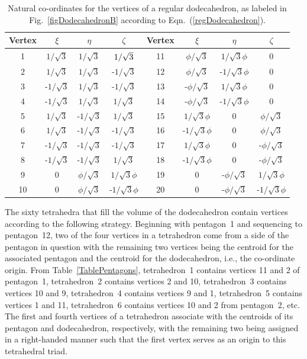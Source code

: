 \begin{table}
	\begin{center}
	\begin{tabular}{|c|ccc||c|ccc|}
		\hline 
		Vertex & $\xi$ & $\eta$ & $\zeta$ & Vertex & $\xi$ & $\eta$ & $\zeta$ \\ \hline
		1 & $1 / \sqrt{3}$ & $1 / \sqrt{3}$ & $1 / \sqrt{3}^{\vphantom{|}}$ & 
		   11 & $\phi / \sqrt{3}$ & $1 / \sqrt{3} \phi$ & 0 \\
		2 & $1 / \sqrt{3}$ & $1 / \sqrt{3}$ & -$1 / \sqrt{3}$ & 
		   12 & $\phi / \sqrt{3}$ & -$1 / \sqrt{3}\phi$ & 0 \\
		3 & -$1 / \sqrt{3}$ & $1 / \sqrt{3}$ & -$1 / \sqrt{3}$ & 
		   13 & -$\phi / \sqrt{3}$ & $1/ \sqrt{3}\phi$ & 0 \\
		4 & -$1 / \sqrt{3}$ & $1 / \sqrt{3}$ & $1 / \sqrt{3}$ & 
		   14 & -$\phi / \sqrt{3}$ & -$1 / \sqrt{3}\phi$ & 0 \\
		5 & $1 / \sqrt{3}$ & -$1 / \sqrt{3}$ & $1 / \sqrt{3}$ & 
		   15 & $1 / \sqrt{3} \phi$ & 0 & $\phi / \sqrt{3}$ \\
		6 & $1 / \sqrt{3}$ & -$1 / \sqrt{3}$ & -$1 / \sqrt{3}$ & 
		   16 & -$1 / \sqrt{3}\phi$ & 0 & $\phi / \sqrt{3}$ \\
		7 & -$1 / \sqrt{3}$ & -$1 / \sqrt{3}$ & -$1 / \sqrt{3}$ & 
		   17 & $1 / \sqrt{3}\phi$ & 0 & -$\phi / \sqrt{3}$ \\
		8 & -$1 / \sqrt{3}$ & -$1 / \sqrt{3}$ & $1 / \sqrt{3}$ & 
		   18 & -$1 / \sqrt{3}\phi$ & 0 & -$\phi / \sqrt{3}$ \\
		9 & 0 & $\phi / \sqrt{3}$ & $1 / \sqrt{3}\phi$ & 
		   19 & 0 & -$\phi / \sqrt{3}$ & $1 / \sqrt{3}\phi$ \\
		10 & 0 & $\phi / \sqrt{3}$ & -$1 / \sqrt{3}\phi$ & 
		   20 & 0 & -$\phi / \sqrt{3}$ & -$1 / \sqrt{3}\phi$ \\
		\hline
	\end{tabular}
	\end{center}
	\caption{Natural co-ordinates for the vertices of a regular dodecahedron, as labeled in Fig.~\ref{figDodecahedronB} according to Eqn.~(\ref{regDodecahedron}).}
	\label{TableDodecahedron}
\end{table}

The sixty tetrahedra that fill the volume of the dodecahedron contain vertices according to the following strategy.  Beginning with pentagon~1 and sequencing to pentagon~12, two of the four vertices in a tetrahedron come from a side of the pentagon in question with the remaining two vertices being the centroid for the associated pentagon and the centroid for the dodecahedron, i.e., the co-ordinate origin.  From Table~\ref{TablePentagons}, tetrahedron~1 contains vertices 11 and 2 of pentagon~1, tetrahedron~2 contains vertices 2 and 10, tetrahedron~3 contains vertices 10 and 9, tetrahedron~4 contains vertices 9 and 1, tetrahedron~5 contains vertices 1 and 11, tetrahedron~6 contains vertices 10 and 2 from pentagon~2, etc.  The first and fourth vertices of a tetrahedron associate with the centroids of its pentagon and dodecahedron, respectively, with the remaining two being assigned in a right-handed manner such that the first vertex serves as an origin to this tetrahedral triad.

